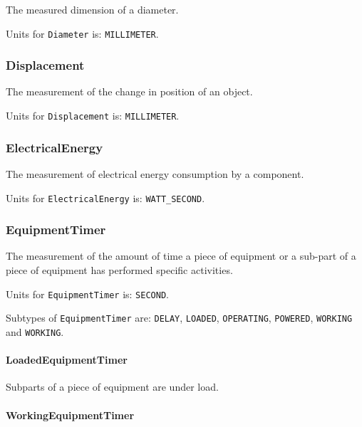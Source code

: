 The measured dimension of a diameter.


Units for \texttt{Diameter} is: \texttt{MILLIMETER}.

\FloatBarrier

\subsubsection{Displacement}
\label{sec:Displacement}



The measurement of the change in position of an object.


Units for \texttt{Displacement} is: \texttt{MILLIMETER}.

\FloatBarrier

\subsubsection{ElectricalEnergy}
\label{sec:ElectricalEnergy}



The measurement of electrical energy consumption by a component.


Units for \texttt{ElectricalEnergy} is: \texttt{WATT_SECOND}.

\FloatBarrier

\subsubsection{EquipmentTimer}
\label{sec:EquipmentTimer}



The measurement of the amount of time a piece of equipment or a sub-part of a piece of equipment has performed specific activities.


Units for \texttt{EquipmentTimer} is: \texttt{SECOND}.


Subtypes of \texttt{EquipmentTimer} are: \texttt{DELAY}, \texttt{LOADED}, \texttt{OPERATING}, \texttt{POWERED}, \texttt{WORKING} and \texttt{WORKING}. 
\FloatBarrier

\paragraph{LoadedEquipmentTimer}\mbox{}
\label{sec:LoadedEquipmentTimer}



Subparts of a piece of equipment are under load.


\paragraph{WorkingEquipmentTimer}\mbox{}
\label{sec:WorkingEquipmentTimer}



